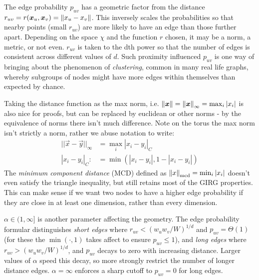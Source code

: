 The edge probability $p_{uv}$ has a geometric factor from the distance $r_{uv} = r(\bm{x}_u, \bm{x}_v) = \left\lVert x_u - x_v\right\rVert$.
This inversely scales the probabilities so that nearby points (small $r_{uv}$) are more likely to have an edge than those further apart.
Depending on the space $\chi$ and the function $r$ chosen, it may be a norm, a metric, or not even.
$r_{uv}$ is taken to the dth power so that the number of edges is consistent across different values of $d$.
Such proximity influenced $p_{uv}$ is one way of bringing about the phenomenon of \textit{clustering}, common in many real life graphs, whereby subgroups of nodes might have more edges within themselves than expected by chance.




Taking the distance function as the max norm, i.e. $\left\lVert \bm{x}\right\rVert = \left\lVert \bm{x}\right\rVert_\infty = \max_i |x_i|$ is also nice for proofs, but can be replaced by euclidean or other norms - by the equivalence of norms there isn't much difference. Note on the torus the max norm isn't strictly a norm, rather we abuse notation to write:
\begin{align}
    ||\vec{x} - \vec{y}||_\infty &= \max_i |x_i - y_i|_C\\
     |x_i - y_i|_C :&= \min(|x_i - y_i|, 1 - |x_i - y_i|)
\end{align}
The \textit{minimum component distance} (MCD) defined as $\left\lVert x\right\rVert_{\mathrm{mcd}} = \min_i |x_i|$ doesn't even satisfy the triangle inequality, but still retains most of the GIRG properties. This can make sense if we want two nodes to have a higher edge probability if they are close in at least one dimension, rather than every dimension.

$\alpha \in (1, \infty]$ is another parameter affecting the geometry. The edge probability formular distinguishes \textit{short edges} where $r_{uv} < (w_u w_v / W)^{1/d}$ and $p_{uv} = \Theta(1)$ (for these the $\min(\cdot, 1)$ takes affect to ensure $p_{uv} \leq 1$), and \textit{long edges} where $r_{uv} > (w_u w_v / W)^{1/d}$, and $p_{uv}$ decays to zero with increasing distance. Larger values of $\alpha$ speed this decay, so more strongly restrict the number of longer distance edges. $\alpha=\infty$ enforces a sharp cutoff to $p_{uv} = 0$ for long edges.

